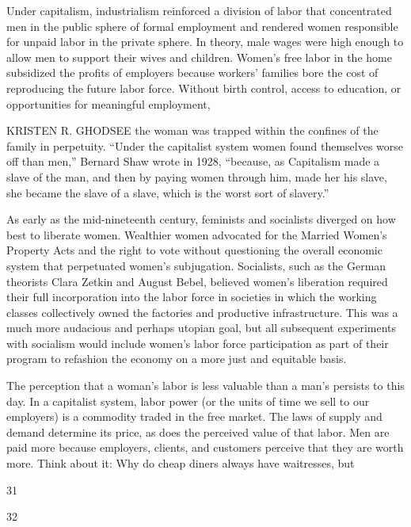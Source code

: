  \par 
Under capitalism, industrialism reinforced a division of labor that concentrated men in the public sphere of formal employment and rendered women responsible for unpaid labor in the private sphere. In theory, male wages were high enough to allow men to support their wives and children. Women’s free labor in the home subsidized the profits of employers because workers’ families bore the cost of reproducing the future labor force. Without birth control, access to education, or opportunities for meaningful employment,
 \par 
KRISTEN R. GHODSEE the woman was trapped within the confines of the family in perpetuity. “Under the capitalist system women found themselves worse off than men,” Bernard Shaw wrote in 1928, “because, as Capitalism made a slave of the man, and then by paying women through him, made her his slave, she became the slave of a slave, which is the worst sort of slavery.”
 \par 
As early as the mid-nineteenth century, feminists and socialists diverged on how best to liberate women. Wealthier women advocated for the Married Women’s Property Acts and the right to vote without questioning the overall economic system that perpetuated women’s subjugation. Socialists, such as the German theorists Clara Zetkin and August Bebel, believed women’s liberation required their full incorporation into the labor force in societies in which the working classes collectively owned the factories and productive infrastructure. This was a much more audacious and perhaps utopian goal, but all subsequent experiments with socialism would include women’s labor force participation as part of their program to refashion the economy on a more just and equitable basis.
 \par 
The perception that a woman’s labor is less valuable than a man’s persists to this day. In a capitalist system, labor power (or the units of time we sell to our employers) is a commodity traded in the free market. The laws of supply and demand determine its price, as does the perceived value of that labor. Men are paid more because employers, clients, and customers perceive that they are worth more. Think about it: Why do cheap diners always have waitresses, but
 \par 
31
 \par 
32
 \par 
